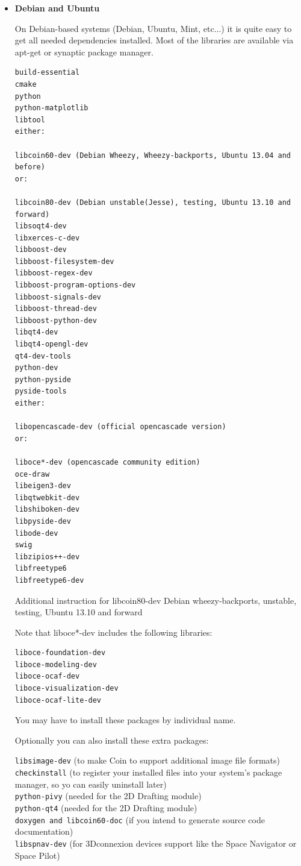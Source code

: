 \begin{itemize}
\item
\textbf{Debian and Ubuntu}

On Debian-based systems (Debian, Ubuntu, Mint, etc...) it is quite easy to get all needed dependencies installed. Most of the libraries are available via apt-get or synaptic package manager.

\begin{verbatim}
build-essential
cmake
python
python-matplotlib
libtool
either:

libcoin60-dev (Debian Wheezy, Wheezy-backports, Ubuntu 13.04 and before)
or:

libcoin80-dev (Debian unstable(Jesse), testing, Ubuntu 13.10 and forward)
libsoqt4-dev
libxerces-c-dev
libboost-dev
libboost-filesystem-dev
libboost-regex-dev
libboost-program-options-dev
libboost-signals-dev
libboost-thread-dev
libboost-python-dev
libqt4-dev
libqt4-opengl-dev
qt4-dev-tools
python-dev
python-pyside
pyside-tools
either:

libopencascade-dev (official opencascade version)
or:

liboce*-dev (opencascade community edition)
oce-draw
libeigen3-dev
libqtwebkit-dev
libshiboken-dev
libpyside-dev
libode-dev
swig
libzipios++-dev
libfreetype6
libfreetype6-dev
\end{verbatim}

Additional instruction for libcoin80-dev Debian wheezy-backports, unstable, testing, Ubuntu 13.10 and forward

Note that liboce*-dev includes the following libraries:
\begin{verbatim}
liboce-foundation-dev
liboce-modeling-dev
liboce-ocaf-dev
liboce-visualization-dev
liboce-ocaf-lite-dev
\end{verbatim}

You may have to install these packages by individual name.

Optionally you can also install these extra packages:


\texttt{libsimage-dev} (to make Coin to support additional image file formats)\\
\texttt{checkinstall} (to register your installed files into your system's package manager, so yo can easily uninstall later)\\
\texttt{python-pivy} (needed for the 2D Drafting module)\\
\texttt{python-qt4} (needed for the 2D Drafting module)\\
\texttt{doxygen and libcoin60-doc} (if you intend to generate source code documentation)\\
\texttt{libspnav-dev} (for 3Dconnexion devices support like the Space Navigator or Space Pilot)



\end{itemize}
